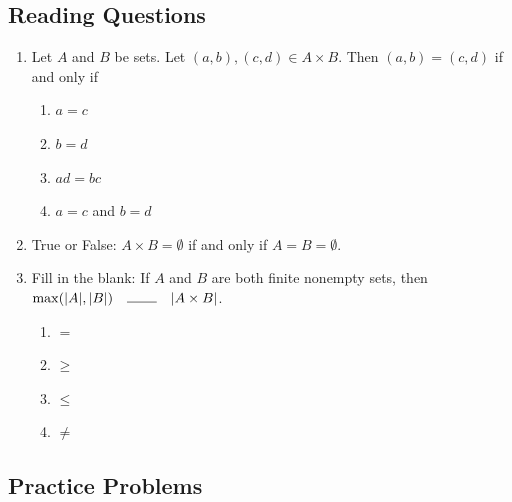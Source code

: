 

\subsection*{Reading Questions}

\begin{enumerate}
    \item Let $A$ and $B$ be sets. Let $(a,b), (c,d) \in A \times B$. Then $(a,b) = (c,d)$ if and only if 
    \begin{enumerate}
        \item $a = c$
        \item $b = d$
        \item $ad = bc$
        \item $a = c$ and $b = d$
    \end{enumerate}
    
    \item True or False: $A \times B = \emptyset$ if and only if $A = B = \emptyset$.
    
    \item Fill in the blank: If $A$ and $B$ are both finite nonempty sets, then $\max(|A|, |B|) \quad \rule{0.75cm}{0.15mm} \quad |A \times B|$.
    \begin{enumerate}
        \item $=$
        \item $\geq$
        \item $\leq$
        \item $\neq$
    \end{enumerate}
\end{enumerate}

\subsection*{Practice Problems}

